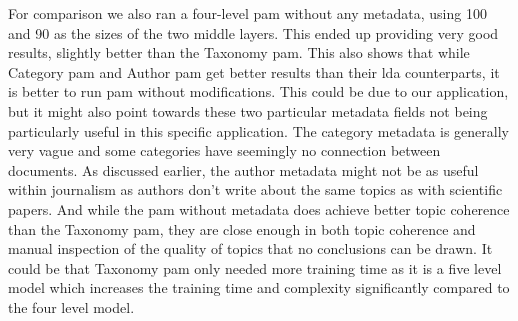 For comparison we also ran a four-level \gls{pam} without any metadata, using 100 and 90 as the sizes of the two middle layers.
This ended up providing very good results, slightly better than the Taxonomy \gls{pam}.
This also shows that while Category \gls{pam} and Author \gls{pam} get better results than their \gls{lda} counterparts, it is better to run \gls{pam} without modifications.
This could be due to our application, but it might also point towards these two particular metadata fields not being particularly useful in this specific application.
The category metadata is generally very vague and some categories have seemingly no connection between documents.
As discussed earlier, the author metadata might not be as useful within journalism as authors don't write about the same topics as with scientific papers.
And while the \gls{pam} without metadata does achieve better topic coherence than the Taxonomy \gls{pam}, they are close enough in both topic coherence and manual inspection of the quality of topics that no conclusions can be drawn.
It could be that Taxonomy \gls{pam} only needed more training time as it is a five level model which increases the training time and complexity significantly compared to the four level model.
